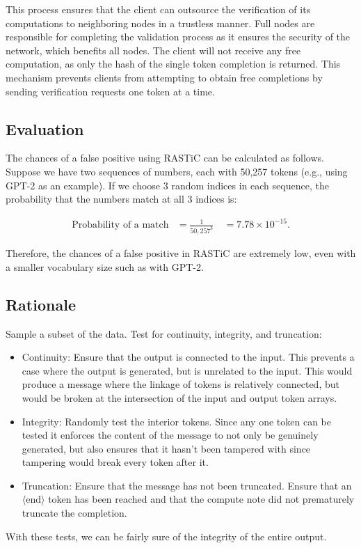 \documentclass{article}
\begin{document}
This process ensures that the client can outsource the verification of its computations to neighboring nodes in a trustless manner.
Full nodes are responsible for completing the validation process as it ensures the security of the network, which benefits all nodes. 
The client will not receive any free computation, as only the hash of the single token completion is returned. 
This mechanism prevents clients from attempting to obtain free completions by sending verification requests one token at a time.

\subsection{Evaluation}

The chances of a false positive using \ac{RASTiC} can be calculated as follows. 
Suppose we have two sequences of numbers, each with 50,257 tokens (e.g., using GPT-2 as an example). 
If we choose 3 random indices in each sequence, the probability that the numbers match at all 3 indices is:

\begin{align*}
\text{Probability of a match} &= \frac{1}{50,257^3} \
&= 7.78 \times 10^{-15}.
\end{align*}

Therefore, the chances of a false positive in \ac{RASTiC} are extremely low, even with a smaller vocabulary size such as with GPT-2.

\subsection{Rationale}
Sample a subset of the data.
Test for continuity, integrity, and truncation:
\begin{itemize}
    \item Continuity: Ensure that the output is connected to the input. This prevents a case where the output is generated, but is unrelated to the input. 
    This would produce a message where the linkage of tokens is relatively connected, but would be broken at the intersection of the input and output token arrays.
    \item Integrity: Randomly test the interior tokens. 
    Since any one token can be tested it enforces the content of the message to not only be genuinely generated, but also ensures that it hasn't been tampered with since tampering would break every token after it.
    \item Truncation: Ensure that the message has not been truncated. Ensure that an $\langle$end$\rangle$ token has been reached and that the compute note did not prematurely truncate the completion.
\end{itemize}
 With these tests, we can be fairly sure of the integrity of the entire output.
\end{document}
